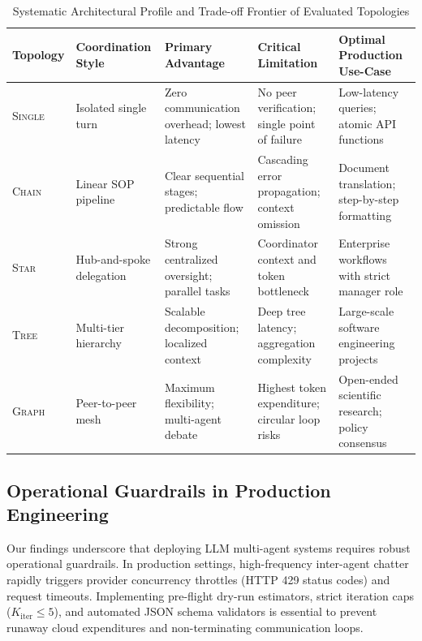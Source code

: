 \begin{table}[t]
\centering
\caption{Systematic Architectural Profile and Trade-off Frontier of Evaluated Topologies}
\label{tab:topology_specs}
\begin{tabular}{@{}lp{3.0cm}p{4.2cm}p{4.2cm}p{3.8cm}@{}}
\hline
\textbf{Topology} & \textbf{Coordination Style} & \textbf{Primary Advantage} & \textbf{Critical Limitation} & \textbf{Optimal Production Use-Case} \\ \hline
\textsc{Single} & Isolated single turn & Zero communication overhead; lowest latency & No peer verification; single point of failure & Low-latency queries; atomic API functions \\
\textsc{Chain}  & Linear SOP pipeline & Clear sequential stages; predictable flow & Cascading error propagation; context omission & Document translation; step-by-step formatting \\
\textsc{Star}   & Hub-and-spoke delegation & Strong centralized oversight; parallel tasks & Coordinator context and token bottleneck & Enterprise workflows with strict manager role \\
\textsc{Tree}   & Multi-tier hierarchy & Scalable decomposition; localized context & Deep tree latency; aggregation complexity & Large-scale software engineering projects \\
\textsc{Graph}  & Peer-to-peer mesh & Maximum flexibility; multi-agent debate & Highest token expenditure; circular loop risks & Open-ended scientific research; policy consensus \\ \hline
\end{tabular}
\end{table}

\subsection{Operational Guardrails in Production Engineering}
Our findings underscore that deploying LLM multi-agent systems requires robust operational guardrails. In production settings, high-frequency inter-agent chatter rapidly triggers provider concurrency throttles (HTTP 429 status codes) and request timeouts. Implementing pre-flight dry-run estimators, strict iteration caps ($K_{\text{iter}} \le 5$), and automated JSON schema validators is essential to prevent runaway cloud expenditures and non-terminating communication loops.

